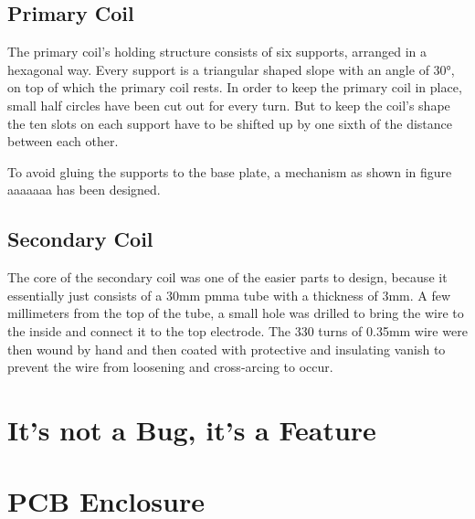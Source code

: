 \subsection{Primary Coil}

The primary coil's holding structure consists of six supports, arranged in a hexagonal way. Every support is a triangular shaped slope with an angle of 30°, on top of which the primary coil rests. In order to keep the primary coil in place, small half circles have been cut out for every turn. But to keep the coil's shape the ten slots on each support have to be shifted up by one sixth of the distance between each other.


To avoid gluing the supports to the base plate, a mechanism as shown in figure aaaaaaa has been designed.


\subsection{Secondary Coil}

The core of the secondary coil was one of the easier parts to design, because it essentially just consists of a 30mm \gls{pmma} tube with a thickness of 3mm. A few millimeters from the top of the tube, a small hole was drilled to bring the wire to the inside and connect it to the top electrode. The 330 turns of 0.35mm wire were then wound by hand and then coated with protective and insulating vanish to prevent the wire from loosening and cross-arcing to occur.


\section{It's not a Bug, it's a Feature} %


\section{PCB Enclosure}

